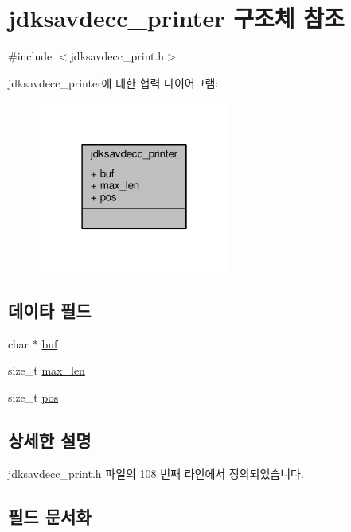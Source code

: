\hypertarget{structjdksavdecc__printer}{}\section{jdksavdecc\+\_\+printer 구조체 참조}
\label{structjdksavdecc__printer}


{\ttfamily \#include $<$jdksavdecc\+\_\+print.\+h$>$}



jdksavdecc\+\_\+printer에 대한 협력 다이어그램\+:
\nopagebreak
\begin{figure}[H]
\begin{center}
\leavevmode
\includegraphics[width=178pt]{structjdksavdecc__printer__coll__graph}
\end{center}
\end{figure}
\subsection*{데이타 필드}
\begin{DoxyCompactItemize}
\item 
char $\ast$ \hyperlink{structjdksavdecc__printer_a1fe855c208bc17a51a4d34fefdb2d5b1}{buf}
\item 
size\+\_\+t \hyperlink{structjdksavdecc__printer_a956cb5a3c4322e6d67c2f2b21077716c}{max\+\_\+len}
\item 
size\+\_\+t \hyperlink{structjdksavdecc__printer_a5438a597ee291f523ae04a9fe355924f}{pos}
\end{DoxyCompactItemize}


\subsection{상세한 설명}


jdksavdecc\+\_\+print.\+h 파일의 108 번째 라인에서 정의되었습니다.



\subsection{필드 문서화}
